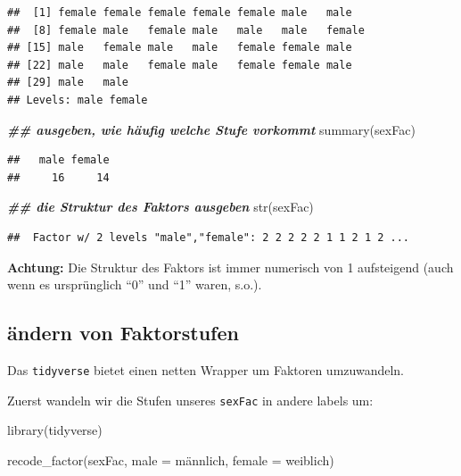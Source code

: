 \documentclass[
]{book}
\newenvironment{Shaded}{\begin{snugshade}}{\end{snugshade}}
\newcommand{\AttributeTok}[1]{\textcolor[rgb]{0.77,0.63,0.00}{#1}}
\newcommand{\DocumentationTok}[1]{\textcolor[rgb]{0.56,0.35,0.01}{\textbf{\textit{#1}}}}
\newcommand{\FunctionTok}[1]{\textcolor[rgb]{0.00,0.00,0.00}{#1}}
\newcommand{\NormalTok}[1]{#1}
\newcommand{\StringTok}[1]{\textcolor[rgb]{0.31,0.60,0.02}{#1}}
\begin{document}
\begin{verbatim}
##  [1] female female female female female male   male  
##  [8] female male   female male   male   male   female
## [15] male   female male   male   female female male  
## [22] male   male   female male   female female male  
## [29] male   male  
## Levels: male female
\end{verbatim}

\begin{Shaded}
\begin{Highlighting}[]
\DocumentationTok{\#\# ausgeben, wie häufig welche Stufe vorkommt}
\FunctionTok{summary}\NormalTok{(sexFac)}
\end{Highlighting}
\end{Shaded}

\begin{verbatim}
##   male female 
##     16     14
\end{verbatim}

\begin{Shaded}
\begin{Highlighting}[]
\DocumentationTok{\#\# die Struktur des Faktors ausgeben}
\FunctionTok{str}\NormalTok{(sexFac)  }
\end{Highlighting}
\end{Shaded}

\begin{verbatim}
##  Factor w/ 2 levels "male","female": 2 2 2 2 2 1 1 2 1 2 ...
\end{verbatim}

\textbf{Achtung:} Die Struktur des Faktors ist immer numerisch von 1 aufsteigend (auch wenn es ursprünglich ``0'' und ``1'' waren, s.o.).

\hypertarget{uxe4ndern-von-faktorstufen}{%
\subsection{ändern von Faktorstufen}\label{uxe4ndern-von-faktorstufen}}

Das \texttt{tidyverse} bietet einen netten Wrapper um Faktoren umzuwandeln.

Zuerst wandeln wir die Stufen unseres \texttt{sexFac} in andere labels um:

\begin{Shaded}
\begin{Highlighting}[]
\FunctionTok{library}\NormalTok{(tidyverse)}

\FunctionTok{recode\_factor}\NormalTok{(sexFac,}
              \AttributeTok{male =} \StringTok{\textquotesingle{}männlich\textquotesingle{}}\NormalTok{,}
              \AttributeTok{female =} \StringTok{\textquotesingle{}weiblich\textquotesingle{}}\NormalTok{)}
\end{Highlighting}
\end{Shaded}
\end{document}
